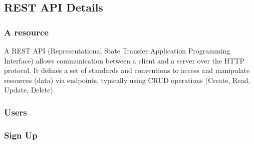\subsection{REST API Details}


\subsubsection*{A resource}


A REST API (Representational State Transfer Application Programming Interface) allows communication between a client and a server over the HTTP protocol. It defines a set of standards and conventions to access and manipulate resources (data) via endpoints, typically using CRUD operations (Create, Read, Update, Delete).


\subsubsection*{Users}

\subsubsection*{Sign Up}

